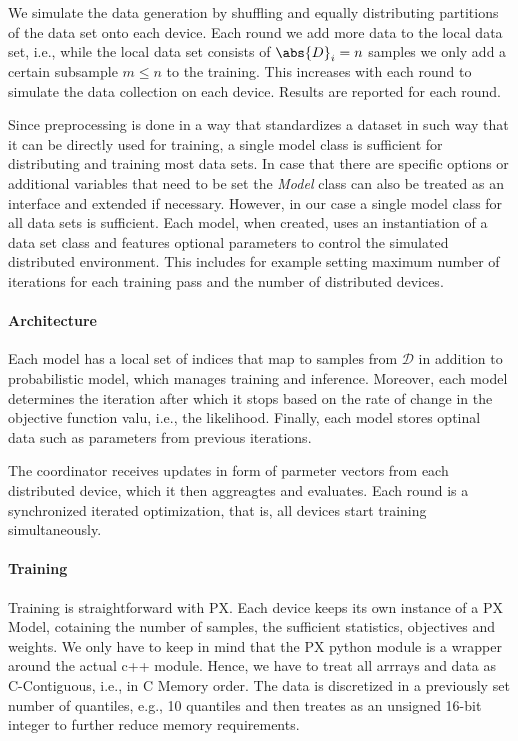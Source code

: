 We simulate the data generation by shuffling and equally distributing partitions of the data set onto each device.
Each round we add more data to the local data set, i.e., while the local data set consists of $\abs{D}_i = n$ samples we only add a certain subsample $m \leq n$ to the training. This increases with each round to simulate the data collection on each device. 
Results are reported for each round.


Since preprocessing is done in a way that standardizes a dataset in such way that it can be directly used for training, a single model class is sufficient for distributing and training most data sets.
In case that there are specific options or additional variables that need to be set the \textit{Model} class can also be treated as an interface and extended if necessary.
However, in our case a single model class for all data sets is sufficient.
Each model, when created, uses an instantiation of a data set class and features optional parameters to control the simulated distributed environment. 
This includes for example setting maximum number of iterations for each training pass and the number of distributed devices.

\paragraph*{Architecture}


Each model has a local set of indices that map to samples from $\mathcal{D}$ in addition to probabilistic model, which manages training and inference.
Moreover, each model determines the iteration after which it stops based on the rate of change in the objective function valu, i.e., the likelihood.
Finally, each model stores optinal data such as parameters from previous iterations.

The coordinator receives updates in form of parmeter vectors from each distributed device, which it then aggreagtes and evaluates.
Each round is a synchronized iterated optimization, that is, all devices start training simultaneously.

\paragraph*{Training}

Training is straightforward with PX. 
Each device keeps its own instance of a PX Model, cotaining the number of samples, the sufficient statistics, objectives and weights.
We only have to keep in mind that the PX python module is a wrapper around the actual c++ module.
Hence, we have to treat all arrrays and data as C-Contiguous, i.e., in C Memory order.
The data is discretized in a previously set number of quantiles, e.g., 10 quantiles and then treates as an unsigned 16-bit integer to further reduce memory requirements.

